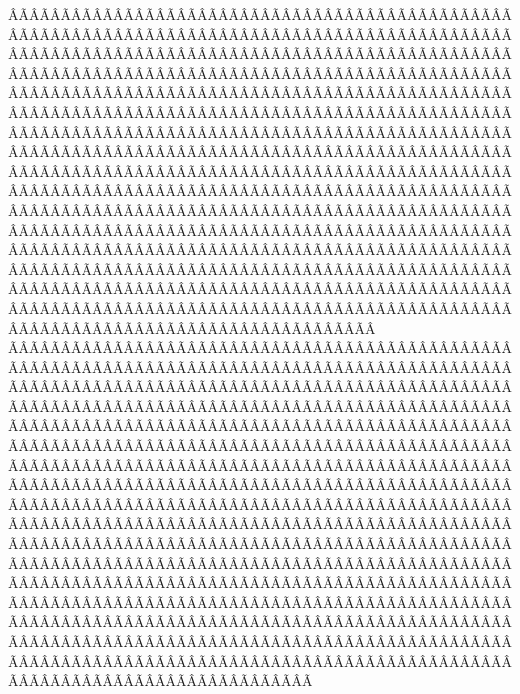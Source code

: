 \begin{sumilla}
\begin{fundamentacion}
ÂÃÂÃÂÃÂÃÂÃÂÃÂÃÂÃÂÃÂÃÂÃÂÃÂÃÂÃÂÃÂÃÂÃÂÃÂÃÂÃÂÃÂÃÂÃÂÃÂÃÂÃÂÃÂÃÂÃÂÃÂÃÂÃÂÃÂÃÂÃÂÃÂÃÂÃÂÃÂÃÂÃÂÃÂÃÂÃÂÃÂÃÂÃÂÃÂÃÂÃÂÃÂÃÂÃÂÃÂÃÂÃÂÃÂÃÂÃÂÃÂÃÂÃÂÃÂÃÂÃÂÃÂÃÂÃÂÃÂÃÂÃÂÃÂÃÂÃÂÃÂÃÂÃÂÃÂÃÂÃÂÃÂÃÂÃÂÃÂÃÂÃÂÃÂÃÂÃÂÃÂÃÂÃÂÃÂÃÂÃÂÃÂÃÂÃÂÃÂÃÂÃÂÃÂÃÂÃÂÃÂÃÂÃÂÃÂÃÂÃÂÃÂÃÂÃÂÃÂÃÂÃÂÃÂÃÂÃÂÃÂÃÂÃÂÃÂÃÂÃÂÃÂÃÂÃÂÃÂÃÂÃÂÃÂÃÂÃÂÃÂÃÂÃÂÃÂÃÂÃÂÃÂÃÂÃÂÃÂÃÂÃÂÃÂÃÂÃÂÃÂÃÂÃÂÃÂÃÂÃÂÃÂÃÂÃÂÃÂÃÂÃÂÃÂÃÂÃÂÃÂÃÂÃÂÃÂÃÂÃÂÃÂÃÂÃÂÃÂÃÂÃÂÃÂÃÂÃÂÃÂÃÂÃÂÃÂÃÂÃÂÃÂÃÂÃÂÃÂÃÂÃÂÃÂÃÂÃÂÃÂÃÂÃÂÃÂÃÂÃÂÃÂÃÂÃÂÃÂÃÂÃÂÃÂÃÂÃÂÃÂÃÂÃÂÃÂÃÂÃÂÃÂÃÂÃÂÃÂÃÂÃÂÃÂÃÂÃÂÃÂÃÂÃÂÃÂÃÂÃÂÃÂÃÂÃÂÃÂÃÂÃÂÃÂÃÂÃÂÃÂÃÂÃÂÃÂÃÂÃÂÃÂÃÂÃÂÃÂÃÂÃÂÃÂÃÂÃÂÃÂÃÂÃÂÃÂÃÂÃÂÃÂÃÂÃÂÃÂÃÂÃÂÃÂÃÂÃÂÃÂÃÂÃÂÃÂÃÂÃÂÃÂÃÂÃÂÃÂÃÂÃÂÃÂÃÂÃÂÃÂÃÂÃÂÃÂÃÂÃÂÃÂÃÂÃÂÃÂÃÂÃÂÃÂÃÂÃÂÃÂÃÂÃÂÃÂÃÂÃÂÃÂÃÂÃÂÃÂÃÂÃÂÃÂÃÂÃÂÃÂÃÂÃÂÃÂÃÂÃÂÃÂÃÂÃÂÃÂÃÂÃÂÃÂÃÂÃÂÃÂÃÂÃÂÃÂÃÂÃÂÃÂÃÂÃÂÃÂÃÂÃÂÃÂÃÂÃÂÃÂÃÂÃÂÃÂÃÂÃÂÃÂÃÂÃÂÃÂÃÂÃÂÃÂÃÂÃÂÃÂÃÂÃÂÃÂÃÂÃÂÃÂÃÂÃÂÃÂÃÂÃÂÃÂÃÂÃÂÃÂÃÂÃÂÃÂÃÂÃÂÃÂÃÂÃÂÃÂÃÂÃÂÃÂÃÂÃÂÃÂÃÂÃÂÃÂÃÂÃÂÃÂÃÂÃÂÃÂÃÂÃÂÃÂÃÂÃÂÃÂÃÂÃÂÃÂÃÂÃÂÃÂÃÂÃÂÃÂÃÂÃÂÃÂÃÂÃÂÃÂÃÂÃÂÃÂÃÂÃÂÃÂÃÂÃÂÃÂÃÂÃÂÃÂÃÂÃÂÃÂÃÂÃÂÃÂÃÂÃÂÃÂÃÂÃÂÃÂÃÂÃÂÃÂÃÂÃÂÃÂÃÂÃÂÃÂÃÂÃÂÃÂÃÂÃÂÃÂÃÂÃÂÃÂÃÂÃÂÃÂÃÂÃÂÃÂÃÂÃÂÃÂÃÂÃÂÃÂÃÂÃÂÃÂÃÂÃÂÃÂÃÂÃÂÃÂÃÂÃÂÃÂÃÂÃÂÃÂÃÂÃÂÃÂÃÂÃÂÃÂÃÂÃÂÃÂÃÂÃÂÃÂÃÂÃÂÃÂÃÂÃÂÃÂÃÂÃÂÃÂÃÂÃÂÃÂÃÂÃÂÃÂÃÂÃÂÃÂÃÂÃÂÃÂÃÂÃÂÃÂÃÂÃÂÃÂÃÂÃÂÃÂÃÂÃÂÃÂÃÂÃÂÃÂÃÂÃÂÃÂÃÂÃÂÃÂÃÂÃÂÃÂÃÂÃÂÃÂÃÂÃÂÃÂÃÂÃÂÃÂÃÂÃÂÃÂÃÂÃÂÃÂÃÂÃÂÃÂÃÂÃÂÃÂÃÂÃÂÃÂÃÂÃÂÃÂÃÂÃÂÃÂÃÂÃÂÃÂÃÂÃÂÃÂÃÂÃÂÃÂÃÂÃÂÃÂÃÂÃÂÃÂÃÂÃÂÃÂÃÂÃÂÃÂÃÂÃÂÃÂÃÂÃÂÃÂÃÂÃÂÃÂÃÂÃÂÃÂÃÂÃÂÃÂÃÂÃÂÃÂÃÂÃÂÃÂÃÂÃÂÃÂÃÂÃÂÃÂÃÂÃÂÃÂÃÂÃÂÃÂÃÂÃÂÃÂÃÂÃÂÃÂÃÂÃÂÃÂÃÂÃÂÃÂÃÂÃÂÃÂÃÂÃÂÃÂÃÂÃÂÃÂÃÂÃÂÃÂÃÂÃÂÃÂÃÂÃÂÃÂÃÂÃÂÃÂÃÂÃÂÃÂÃÂÃÂÃÂÃÂÃÂÃÂÃÂÃÂÃÂÃÂÃÂÃÂÃÂÃÂÃÂÃÂÃÂÃÂÃÂÃÂÃÂÃÂÃÂÃÂÃÂÃÂÃÂÃÂÃÂÃÂÃÂÃÂÃÂÃÂÃÂÃÂÃÂÃÂÃÂÃÂÃÂÃÂÃÂÃÂÃÂÃÂÃÂÃÂÃÂÃÂÃÂÃÂÃÂÃÂÃÂÃÂÃÂÃÂÃÂÃÂÃÂÃÂÃÂÃÂÃÂÃÂÃÂÃÂÃÂÃÂÃÂÃÂÃÂÃÂÃÂÃÂÃÂÃÂÃÂÃÂÃÂÃÂÃÂÃÂÃÂÃÂÃÂÃÂÃÂÃÂÃÂÃÂÃÂÃÂÃÂÃÂÃÂÃÂÃÂÃÂÃÂÃÂÃÂÃÂÃÂÃÂÃÂÃÂÃÂÃÂÃÂÃÂÃÂÃÂÃÂÃÂÃÂÃÂÃÂÃÂÃÂÃÂÃÂÃÂÃÂÃÂÃÂÃÂÃÂÃÂÃÂÃÂÃÂÃÂÃÂÃÂÃÂÃÂÃÂÃÂÃÂÃÂÃÂÃÂÃÂÃÂÃÂÃÂÃÂÃÂÃÂÃÂÃÂÃÂÃÂÃÂÃÂÃ
\end{fundamentacion}
\end{sumilla}
